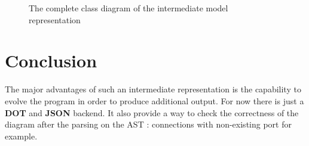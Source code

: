 \begin{figure}[H]
  \centering
  \caption[Class diagram of the intermediate model]{The complete class diagram of the intermediate model representation}
  \label{fig:model-class-diagram}
\end{figure}

\section{Conclusion}

The major advantages of such an intermediate representation is the capability to
evolve the program in order to produce additional output. For now there is just
a \textbf{DOT} and \textbf{JSON} backend. It also provide a way to check the
correctness of the diagram after the parsing on the AST : connections with
non-existing port for example.

